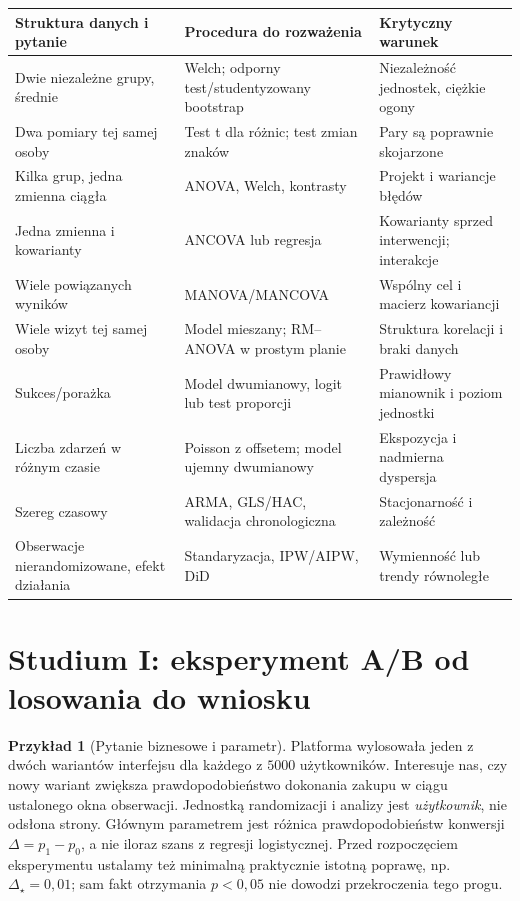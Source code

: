 \documentclass[11pt,a4paper,oneside]{report}
\numberwithin{equation}{chapter}
\theoremstyle{plain}
\theoremstyle{definition}
\newtheorem{przyklad}{Przykład}[chapter]
\theoremstyle{remark}
\begin{document}
\begin{center}\small
\begin{tabular}{>{\raggedright\arraybackslash}p{}>{\raggedright\arraybackslash}p{}>{\raggedright\arraybackslash}p{}}
\toprule
\textbf{Struktura danych i pytanie} & \textbf{Procedura do rozważenia} & \textbf{Krytyczny warunek}\\
\midrule
Dwie niezależne grupy, średnie & Welch; odporny test/studentyzowany bootstrap & Niezależność jednostek, ciężkie ogony\\
Dwa pomiary tej samej osoby & Test t dla różnic; test zmian znaków & Pary są poprawnie skojarzone\\
Kilka grup, jedna zmienna ciągła & ANOVA, Welch, kontrasty & Projekt i wariancje błędów\\
Jedna zmienna i kowarianty & ANCOVA lub regresja & Kowarianty sprzed interwencji; interakcje\\
Wiele powiązanych wyników & MANOVA/MANCOVA & Wspólny cel i macierz kowariancji\\
Wiele wizyt tej samej osoby & Model mieszany; RM--ANOVA w prostym planie & Struktura korelacji i braki danych\\
Sukces/porażka & Model dwumianowy, logit lub test proporcji & Prawidłowy mianownik i poziom jednostki\\
Liczba zdarzeń w różnym czasie & Poisson z offsetem; model ujemny dwumianowy & Ekspozycja i nadmierna dyspersja\\
Szereg czasowy & ARMA, GLS/HAC, walidacja chronologiczna & Stacjonarność i zależność\\
Obserwacje nierandomizowane, efekt działania & Standaryzacja, IPW/AIPW, DiD & Wymienność lub trendy równoległe\\
\bottomrule
\end{tabular}
\end{center}

\section{Studium I: eksperyment A/B od losowania do wniosku}
\begin{przyklad}[Pytanie biznesowe i parametr]
Platforma wylosowała jeden z dwóch wariantów interfejsu dla każdego z $5000$ użytkowników. Interesuje nas, czy nowy wariant zwiększa prawdopodobieństwo dokonania zakupu w ciągu ustalonego okna obserwacji. Jednostką randomizacji i analizy jest \emph{użytkownik}, nie odsłona strony. Głównym parametrem jest różnica prawdopodobieństw konwersji $\Delta=p_1-p_0$, a nie iloraz szans z regresji logistycznej. Przed rozpoczęciem eksperymentu ustalamy też minimalną praktycznie istotną poprawę, np. $\Delta_\star=0{,}01$; sam fakt otrzymania $p<0{,}05$ nie dowodzi przekroczenia tego progu.
\end{przyklad}
\end{document}
